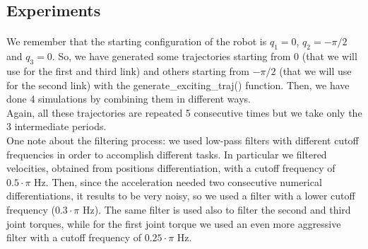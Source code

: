 \documentclass{article}
\begin{document}
\subsection{Experiments}
\paragraph{}We remember that the starting configuration of the robot is $q_1 = 0$, $q_2 = -\pi/2$ and $q_3 = 0$. So, we have generated some trajectories starting from 0 (that we will use for the first and third link) and others starting from $-\pi/2$ (that we will use for the second link) with the generate\_exciting\_traj() function. Then, we have done 4 simulations by combining them in different ways.\\ Again, all these trajectories are repeated 5 consecutive times but we take only the 3 intermediate periods.\\
One note about the filtering process: we used low-pass filters with different cutoff frequencies in order to accomplish different tasks. In particular we filtered velocities, obtained from positions differentiation, with a cutoff frequency of $0.5 \cdot \pi$ Hz. Then, since the acceleration needed two consecutive numerical differentiations, it results to be very noisy, so we used a filter with a lower cutoff frequency ($0.3 \cdot \pi$ Hz). The same filter is used also to filter the second and third joint torques, while for the first joint torque we used an even more aggressive filter with a cutoff frequency of $0.25 \cdot \pi$ Hz.
\end{document}
